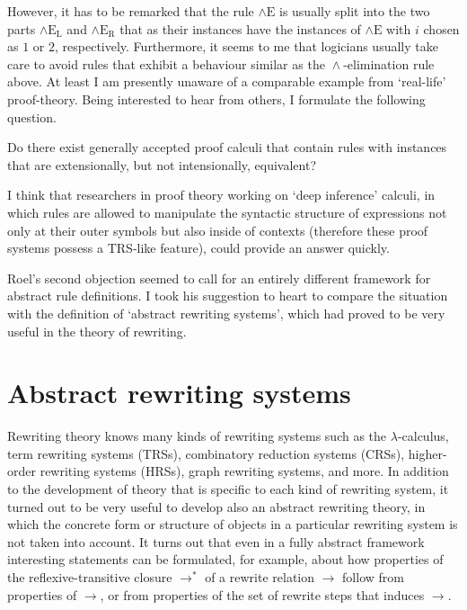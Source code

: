\documentclass[envcountsame,runningheads]{llncs}
\newcommand{\sred}{{\rightarrow}}
\newcommand{\slogand}{{\wedge}}
\newcommand{\logand}{\mathrel{\slogand}}
\newcommand{\sAndElim}{{\slogand\text{E}}}
\newcommand{\sAndElimLeft}{{\slogand\text{E}_{\text{L}}}}
\newcommand{\sAndElimRight}{{\slogand\text{E}_{\text{R}}}}
\begin{document}
However, it has to be remarked that the rule $\sAndElim$ is usually split 
into the two parts $\sAndElimLeft$ and $\sAndElimRight$ 
that as their instances have the instances of $\sAndElim$
with $i$ chosen as $1$ or $2$, respectively.
Furthermore, it seems to me that logicians usually take care to avoid
rules that exhibit a behaviour similar as the $\logand$-elimination rule
above. At least I am presently unaware of a comparable example from 
`real-life' proof-theory. Being interested to hear from others, I formulate
the following question.


\begin{question}
Do there exist generally accepted proof calculi that contain
  rules with instances that are extensionally, but not
  intensionally, equivalent?
\end{question}


I think that researchers in proof theory working on 
`deep inference' calculi, in which rules are allowed to
manipulate the syntactic structure of expressions not only
at their outer symbols but also inside of contexts
(therefore these proof systems possess a TRS-like feature),
could provide an answer quickly. 

Roel's second objection seemed to call for an entirely different framework
for abstract rule definitions. I took his suggestion to heart to
compare the situation with the definition of `abstract rewriting systems',
which had proved to be very useful in the theory of rewriting.



\section{Abstract rewriting systems}
  \label{sec:ARSs}


Rewriting theory knows many kinds of rewriting systems such as 
the $\lambda$-calculus, term rewriting systems (TRSs), combinatory reduction systems (CRSs),
higher-order rewriting systems (HRSs), graph rewriting systems,
and more.
In addition to the development of theory that is specific to 
each kind 
of rewriting system, it turned out to be very useful to develop also
an abstract rewriting theory, in which the concrete form or structure
of objects in a particular rewriting system is not taken into account. 
It turns out that even in a fully abstract framework
interesting statements can be formulated, for example, about
how properties of the reflexive-transitive closure $\sred^*$
of a rewrite relation $\sred$ follow from properties of $\sred$,
or from properties of the set of rewrite steps that induces $\sred$.  
\end{document}
